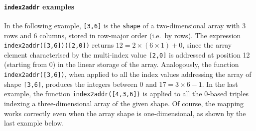 \documentclass[11pt,oneside]{article}	%
\begin{document}
\paragraph{\texttt{index2addr} examples}
In the following example, \texttt{[3,6]} is the \texttt{shape} of a two-dimen\-sion\-al array with 3 rows and 6 columns, stored in row-major order (i.e.~by rows). The expression \texttt{index2addr([3,6])([2,0])} returns $12=2\times(6\times 1)+0$, since the array element characterised by the multi-index value \texttt{[2,0]} is addressed at position 12 (starting from 0) in the linear storage of the array. Analogously, the function \texttt{index2addr([3,6])}, when applied to all the index values addressing the array of shape \texttt{[3,6]}, produces the integers between 0 and $17 = 3\times 6 -1$. In the last example, the function \texttt{index2addr([4,3,6])} is applied to all the 0-based triples indexing a three-dimensional array of the given shape. Of course, the mapping works correctly even when the array shape is one-dimensional, as shown by the last example below.
\end{document}
